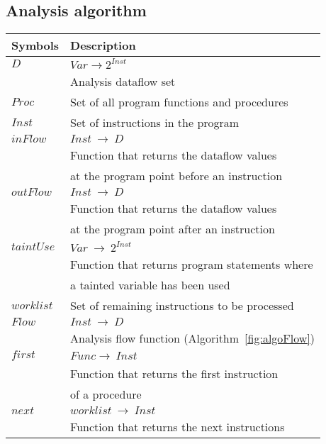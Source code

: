 \subsection{Analysis algorithm} 
\begin{table}
\begin{tabular}{|l|l|}
\hline
\textbf{Symbols}				&	\textbf{Description}								\\ \hline
$\mathit{D}$					&	$\mathit{Var} \rightarrow 2^\mathit{Inst}$			\\
								&	Analysis dataflow set 								\\ \hline
$\mathit{Proc}$					&	Set of all program functions and procedures 		\\ \hline
$\mathit{Inst}$					&	Set of instructions in the program 					\\ \hline
$\mathit{inFlow}$				&	$\mathit{Inst}\ \rightarrow\ \mathit{D}$ 			\\
								&	Function that returns the dataflow values			\\
		    					&	at the program point before an instruction 			\\ 	\hline
$\mathit{outFlow}$				&	$\mathit{Inst}\ \rightarrow\ \mathit{D}$ 			\\
								&	Function that returns the dataflow values			\\
		    					&	at the program point after an instruction 			\\ 	\hline
$\mathit{taintUse}$				&	$\mathit{Var}\ \rightarrow\ 2^{Inst}$ 				\\
								&	Function that returns program statements where		\\
		    					&	a tainted variable has been used	 				\\ 	\hline		    		
$\mathit{worklist}$				&	Set of remaining instructions to be processed 		\\ \hline
$\mathit{Flow}$					&	$\mathit{Inst}\ \rightarrow\ \mathit{D}$ 			\\
								&   Analysis flow function (Algorithm~\ref{fig:algoFlow}) 			\\ \hline
$\mathit{first}$				&	$\mathit{Func} \rightarrow\ \mathit{Inst}$ 			\\
								& 	Function that returns the first instruction			\\
								&	of a procedure										\\ \hline
$\mathit{next}$					&	$\mathit{worklist}\ \rightarrow\ \mathit{Inst}$ 	\\
								& 	Function that returns the next instructions			\\

\end{tabular}
\end{table}
